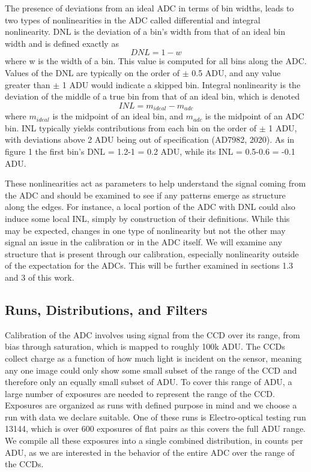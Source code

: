 \documentclass[11pt, letterpaper]{article}
\begin{document}
The presence of deviations from an ideal ADC in terms of bin widths, leads to two types of nonlinearities in the ADC called differential and integral nonlinearity. 
DNL is the deviation of a bin's width from that of an ideal bin width and is defined exactly as
\begin{equation}\label{}
DNL =1- w  
\end{equation}
where w is the width of a bin. 
This value is computed for all bins along the ADC. 
Values of the DNL are typically on the order of $\pm$ 0.5 ADU, and any value greater than $\pm$ 1 ADU would indicate a skipped bin. 
Integral nonlinearity is the deviation of the middle of a true bin from that of an ideal bin, which is denoted 
\begin{equation}\label{}
INL = m_{ideal} - m_{adc} 
\end{equation}
where $m_{ideal}$ is the midpoint of an ideal bin, and $m_{adc}$ is the midpoint of an ADC bin. 
INL typically yields contributions from each bin on the order of $\pm$ 1 ADU, with deviations above 2 ADU being out of specification (AD7982, 2020). 
As in figure 1 the first bin's DNL = 1.2-1 = 0.2 ADU, while its INL = 0.5-0.6 = -0.1 ADU. 
\indent


These nonlinearities act as parameters to help understand the signal coming from the ADC and should be examined to see if any patterns emerge as structure along the edges. 
For instance, a local portion of the ADC with DNL could also induce some local INL, simply by construction of their definitions.
While this may be expected, changes in one type of nonlinearity but not the other may signal an issue in the calibration or in the ADC itself.
We will examine any structure that is present through our calibration, especially nonlinearity outside of the expectation for the ADCs. 
This will be further examined in sections 1.3 and 3 of this work.


\subsection{Runs, Distributions, and Filters}
\indent

Calibration of the ADC involves using signal from the CCD over its range, from bias through saturation, which is mapped to roughly 100k ADU. 
The CCDs collect charge as a function of how much light is incident on the sensor, meaning any one image could only show some small subset of the range of the CCD and therefore only an equally small subset of ADU.
To cover this range of ADU, a large number of exposures are needed to represent the range of the CCD. 
Exposures are organized as runs with defined purpose in mind and we choose a run with data we declare suitable. 
One of these runs is Electro-optical testing run 13144, which is over 600 exposures of flat pairs as this covers the full ADU range. 
We compile all these exposures into a single combined distribution, in counts per ADU, as we are interested in the behavior of the entire ADC over the range of the CCDs. 
\end{document}
